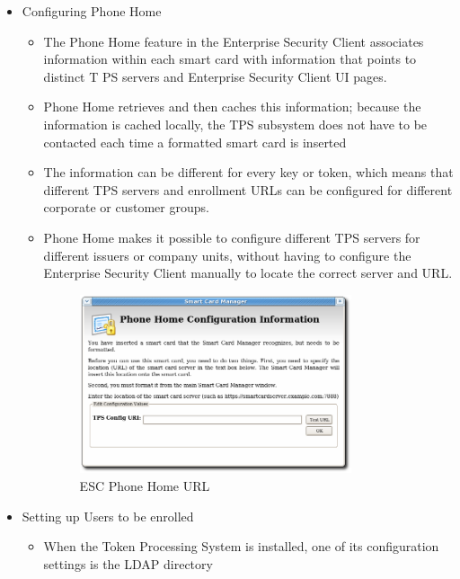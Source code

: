 \documentclass[a4paper]{article}
\begin{document}
\begin{itemize}
             \begin{itemize}
                \item  {Configuring Phone Home}
                    \begin{itemize}
                        \item The Phone Home feature in the Enterprise Security Client associates information within each smart card
                            with information that points to distinct T PS servers and Enterprise Security Client UI pages.
                        \item  Phone Home retrieves and then caches this information; because the information is cached locally,
                            the TPS subsystem does not have to be contacted each time a formatted smart card is inserted
                        \item The information can be different for every key or token, which means that different TPS servers and
                             enrollment URLs can be configured for different corporate or customer groups.
                        \item Phone Home makes it possible to configure different TPS servers for different issuers or company units,
                             without having to configure the Enterprise Security Client manually to locate the correct server and URL.
                             \begin{figure}[H]
                                 \centering
                                 \includegraphics[width=80mm]{phonehomeurl.png}
                                 \caption{ESC Phone Home URL ~\cite{RedHat:smartcard}}
                             \end{figure}
                    \end{itemize}
                 \item {Setting up Users to be enrolled}
                     \begin{itemize}
                        \item When the Token Processing System is installed, one of its configuration settings is the LDAP directory

\end{itemize}
\end{itemize}
\end{itemize}
\end{document}
